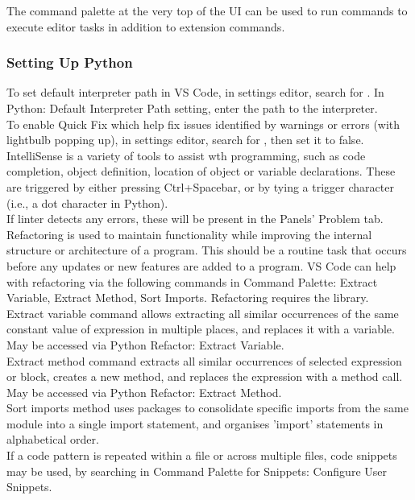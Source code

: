 The command palette at the very top of the UI can be used to run commands to execute editor tasks in addition to extension commands.\\

\subsubsection{Setting Up Python}

To set default interpreter path in VS Code, in settings editor, search for . In Python: Default Interpreter Path setting, enter the path to the interpreter.\\

To enable Quick Fix which help fix issues identified by warnings or errors (with lightbulb popping up), in settings editor, search for , then set it to false.\\

IntelliSense is a variety of tools to assist wth programming, such as code completion, object definition, location of object or variable declarations. These are triggered by either pressing Ctrl+Spacebar, or by tying a trigger character (i.e., a dot character in Python).\\

If linter detects any errors, these will be present in the Panels' Problem tab.\\

Refactoring is used to maintain functionality while improving the internal structure or architecture of a program. This should be a routine task that occurs before any updates or new features are added to a program. VS Code can help with refactoring via the following commands in Command Palette: Extract Variable, Extract Method, Sort Imports. Refactoring requires the  library.\\
Extract variable command allows extracting all similar occurrences of the same constant value of expression in multiple places, and replaces it with a variable. May be accessed via Python Refactor: Extract Variable.\\
Extract method command extracts all similar occurrences of selected expression or block, creates a new method, and replaces the expression with a method call. May be accessed via Python Refactor: Extract Method.\\
Sort imports method uses  packages to consolidate specific imports from the same module into a single import statement, and organises 'import' statements in alphabetical order.\\

If a code pattern is repeated within a file or across multiple files, code snippets may be used, by searching in Command Palette for Snippets: Configure User Snippets. 
